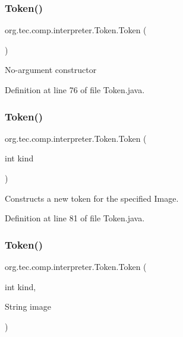 \subsubsection{\texorpdfstring{Token()}{Token()}\hspace{0.1cm}{\footnotesize\ttfamily [1/3]}}
{\footnotesize\ttfamily org.\+tec.\+comp.\+interpreter.\+Token.\+Token (\begin{DoxyParamCaption}{ }\end{DoxyParamCaption})\hspace{0.3cm}{\ttfamily [inline]}}

No-\/argument constructor 

Definition at line 76 of file Token.\+java.

\mbox{\label{classorg_1_1tec_1_1comp_1_1interpreter_1_1_token_a3c4142753b4493ff86b2b466bc10e821}} 
\subsubsection{\texorpdfstring{Token()}{Token()}\hspace{0.1cm}{\footnotesize\ttfamily [2/3]}}
{\footnotesize\ttfamily org.\+tec.\+comp.\+interpreter.\+Token.\+Token (\begin{DoxyParamCaption}\item[{int}]{kind }\end{DoxyParamCaption})\hspace{0.3cm}{\ttfamily [inline]}}

Constructs a new token for the specified Image. 

Definition at line 81 of file Token.\+java.

\mbox{\label{classorg_1_1tec_1_1comp_1_1interpreter_1_1_token_a7214177c568cccfbeb98f456ddf49580}} 
\subsubsection{\texorpdfstring{Token()}{Token()}\hspace{0.1cm}{\footnotesize\ttfamily [3/3]}}
{\footnotesize\ttfamily org.\+tec.\+comp.\+interpreter.\+Token.\+Token (\begin{DoxyParamCaption}\item[{int}]{kind,  }\item[{String}]{image }\end{DoxyParamCaption})\hspace{0.3cm}{\ttfamily [inline]}}

